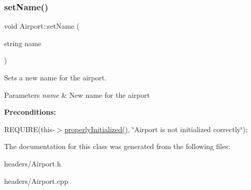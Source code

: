 \subsubsection{\texorpdfstring{set\+Name()}{setName()}}
{\footnotesize\ttfamily void Airport\+::set\+Name (\begin{DoxyParamCaption}\item[{string}]{name }\end{DoxyParamCaption})}



Sets a new name for the airport. 


\begin{DoxyParams}{Parameters}
{\em name} & New name for the airport\\
\hline
\end{DoxyParams}
{\bfseries Preconditions\+:}
\begin{DoxyItemize}
\item R\+E\+Q\+U\+I\+RE(this-\/$>$\mbox{\hyperlink{class_airport_aa13e68ac58e8875837fbe888325cfff6}{properly\+Initialized()}}, \char`\"{}\+Airport is not initialized correctly\char`\"{}); 
\end{DoxyItemize}

The documentation for this class was generated from the following files\+:\begin{DoxyCompactItemize}
\item 
headers/Airport.\+h\item 
headers/Airport.\+cpp\end{DoxyCompactItemize}
